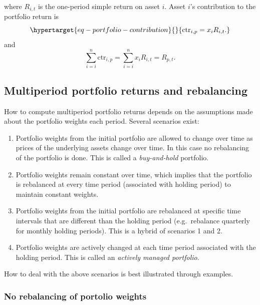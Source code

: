 \documentclass[
  letterpaper,
  DIV=11,
  numbers=noendperiod]{scrreprt}
\providecommand{\tightlist}{%
  \setlength{\itemsep}{0pt}\setlength{\parskip}{0pt}}\usepackage{longtable,booktabs,array}
\theoremstyle{definition}
\theoremstyle{definition}
\theoremstyle{remark}
\begin{document}
where \(R_{i,t}\) is the one-period simple return on asset \(i\). Asset
\(i\)'s contribution to the portfolio return is
\begin{equation}\protect\hypertarget{eq-portfolio-contribution}{}{
\mathrm{ctr}_{i,p} = x_{i}R_{i,t}.
}\label{eq-portfolio-contribution}\end{equation} and
\[\sum_{i=i}^n \mathrm{ctr}_{i,p} = \sum_{i=i}^n x_{i}R_{i,t} = R_{p,t}.\]

\hypertarget{multiperiod-portfolio-returns-and-rebalancing}{%
\subsection{Multiperiod portfolio returns and
rebalancing}\label{multiperiod-portfolio-returns-and-rebalancing}}

How to compute multiperiod portfolio returns depends on the assumptions
made about the portfolio weights each period. Several scenarios exist:

\begin{enumerate}
\def\labelenumi{\arabic{enumi}.}
\tightlist
\item
  Portfolio weights from the initial portfolio are allowed to change
  over time as prices of the underlying assets change over time. In this
  case no rebalancing of the portfolio is done. This is called a
  \emph{buy-and-hold} portfolio.
\item
  Portfolio weights remain constant over time, which implies that the
  portfolio is rebalanced at every time period (associated with holding
  period) to maintain constant weights.
\item
  Portfolio weights from the initial portfolio are rebalanced at
  specific time intervals that are different than the holding period
  (e.g.~rebalance quarterly for monthly holding periods). This is a
  hybrid of scenarios 1 and 2.
\item
  Portfolio weights are actively changed at each time period associated
  with the holding period. This is called an \emph{actively managed
  portfolio}.
\end{enumerate}

How to deal with the above scenarios is best illustrated through
examples.

\hypertarget{no-rebalancing-of-portolio-weights}{%
\subsubsection{No rebalancing of portolio
weights}\label{no-rebalancing-of-portolio-weights}}
\end{document}
